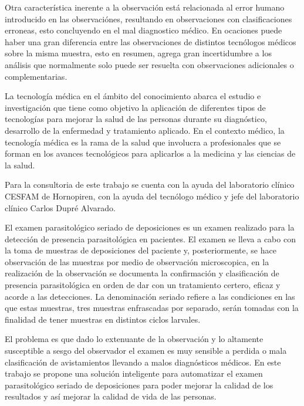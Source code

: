\documentclass[letter,12pt]{report}
\begin{document}
    Otra característica inerente a la observación está relacionada al error humano
    introducido en las observaciónes, resultando en observaciones con clasificaciones
    erroneas, esto concluyendo en el mal diagnostico médico. En ocaciones puede haber una
    gran diferencia entre las observaciones de distintos tecnólogos médicos sobre la
    misma muestra, esto en resumen, agrega gran incertidumbre a los análisis que
    normalmente solo puede ser resuelta con observaciones adicionales o complementarias.

    La tecnología médica en el ámbito del conocimiento abarca el estudio e investigación
    que tiene como objetivo la aplicación de diferentes tipos de tecnologías para mejorar
    la salud de las personas durante su diagnóstico, desarrollo de la enfermedad y
    tratamiento aplicado. En el contexto médico, la tecnología médica es la rama de la
    salud que involucra a profesionales que se forman en los avances tecnológicos para
    aplicarlos a la medicina y las ciencias de la salud. %

    Para la consultoria de este trabajo se cuenta con la ayuda del laboratorio clínico
    CESFAM de Hornopiren, con la ayuda del tecnólogo médico y jefe del laboratorio
    clínico Carlos Dupré Alvarado.

    El examen parasitológico seriado de deposiciones es un examen realizado para la
    detección de presencia parasitológica en pacientes. El examen se lleva a cabo con la
    toma de muestras de deposiciones del paciente y, posteriormente, se hace observación
    de las muestras por medio de observación microscopica, en la realización de la
    observación se documenta la confirmación y clasificación de presencia parasitológica
    en orden de dar con un tratamiento certero, eficaz y acorde a las detecciones. %
    La denominación seriado refiere a las condiciones en las que estas muestras, tres
    muestras enfrascadas por separado, serán tomadas con la finalidad de tener muestras
    en distintos ciclos larvales.

    El problema es que dado lo extenuante de la observación y lo altamente susceptible a
    sesgo del observador el examen es muy sensible a perdida o mala clasificación de
    avistamientos llevando a malos diagnósticos médicos. En este trabajo se propone una
    solución inteligente para automatizar el examen parasitológico seriado de
    deposiciones para poder mejorar la calidad de los resultados y así mejorar la calidad
    de vida de las personas.
\end{document}
